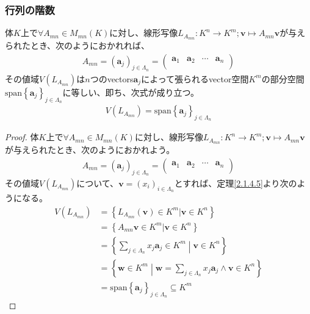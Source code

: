 \documentclass[dvipdfmx]{jsarticle}
\begin{document}
\subsubsection{行列の階数}%
\begin{thm}\label{2.1.4.10}
体$K$上で$\forall A_{mn} \in M_{mn}(K)$に対し、線形写像$L_{A_{mn}}:K^{n} \rightarrow K^{m};\mathbf{v} \mapsto A_{mn}\mathbf{v}$が与えられたとき、次のようにおかれれば、
\begin{align*}
A_{mn} = \left( \mathbf{a}_{j} \right)_{j \in \varLambda_{n}} = \begin{pmatrix}
\mathbf{a}_{1} & \mathbf{a}_{2} & \cdots & \mathbf{a}_{n} \\
\end{pmatrix}
\end{align*}
その値域$V\left( L_{A_{mn}} \right)$は$n$つのvectors$\mathbf{a}_{j}$によって張られるvector空間$K^{m}$の部分空間${\mathrm{span} }\left\{ \mathbf{a}_{j} \right\}_{j \in \varLambda_{n}}$に等しい、即ち、次式が成り立つ。
\begin{align*}
V\left( L_{A_{mn}} \right) = {\mathrm{span} }\left\{ \mathbf{a}_{j} \right\}_{j \in \varLambda_{n}}
\end{align*}
\end{thm}
\begin{proof}
体$K$上で$\forall A_{mn} \in M_{mn}(K)$に対し、線形写像$L_{A_{mn}}:K^{n} \rightarrow K^{m};\mathbf{v} \mapsto A_{mn}\mathbf{v}$が与えられたとき、次のようにおかれよう。
\begin{align*}
A_{mn} = \left( \mathbf{a}_{j} \right)_{j \in \varLambda_{n}} = \begin{pmatrix}
\mathbf{a}_{1} & \mathbf{a}_{2} & \cdots & \mathbf{a}_{n} \\
\end{pmatrix}
\end{align*}
その値域$V\left( L_{A_{mn}} \right)$について、$\mathbf{v} = \left( x_{i} \right)_{i \in \varLambda_{n}}$とすれば、定理\ref{2.1.4.5}より次のようになる。
\begin{align*}
V\left( L_{A_{mn}} \right) &= \left\{ L_{A_{mn}}\left( \mathbf{v} \right) \in K^{m}|\mathbf{v} \in K^{n} \right\}\\
&= \left\{ A_{mn}\mathbf{v} \in K^{m}|\mathbf{v} \in K^{n} \right\}\\
&= \left\{ \sum_{j \in \varLambda_{n}} {x_{j}\mathbf{a}_{j}} \in K^{m} \middle| \mathbf{v} \in K^{n} \right\}\\
&= \left\{ \mathbf{w} \in K^{m} \middle| \mathbf{w} = \sum_{j \in \varLambda_{n}} {x_{j}\mathbf{a}_{j}} \land \mathbf{v} \in K^{n} \right\}\\
&= {\mathrm{span} }\left\{ \mathbf{a}_{j} \right\}_{j \in \varLambda_{n}} \subseteq K^{m}
\end{align*}
\end{proof}
\end{document}
